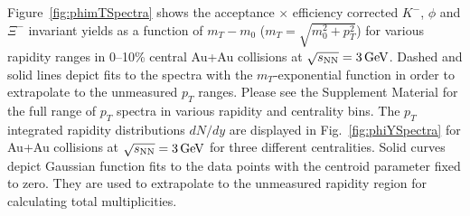 \documentclass[%
 reprint,	
showpacs,
 amsmath,amssymb,
 aps,
 superscriptaddress,
]{revtex4-1}
\begin{document}
Figure~\ref{fig:phimTSpectra} shows the acceptance $\times$ efficiency corrected $K^-$, $\phi$ and $\Xi^-$ invariant yields as a function of $m_T-m_0$ ($m_T = \sqrt{m_{0}^{2}+p_{T}^2}$) for various rapidity ranges in 0--10\% central Au+Au collisions at ${\sqrt{s_{\rm NN}} = \rm{3\,GeV}}$. %
Dashed and solid lines depict fits to the spectra with the $m_T$-exponential function in order to extrapolate to the unmeasured $p_T$ ranges. Please see the Supplement Material for the full range of $p_T$ spectra in various rapidity and centrality bins.
The $p_T$ integrated rapidity distributions $dN/dy$ are displayed in Fig.~\ref{fig:phiYSpectra} for Au+Au collisions at ${\sqrt{s_{\rm NN}} = \rm{3\,GeV}}$ for three different centralities. %
Solid curves depict Gaussian function fits to the data points with the centroid parameter fixed to zero. They are used to extrapolate to the unmeasured rapidity region for calculating total multiplicities.
\end{document}
